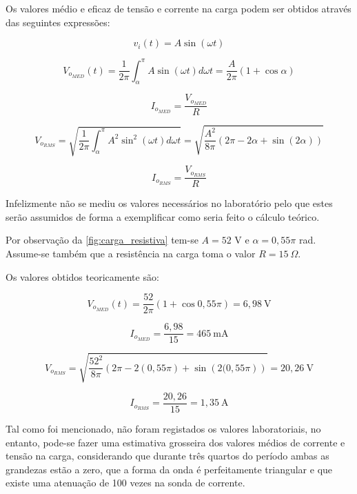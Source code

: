 \documentclass[a4paper,11pt]{article}
\numberwithin{equation}{section}
\begin{document}
Os valores médio e eficaz de tensão e corrente na carga podem ser obtidos através das seguintes expressões:


\begin{equation}
v_i(t)=A \sin(\omega t)
\end{equation}

\begin{equation}
V_{o_{MED}} (t) = \frac{1}{2\pi} \int_{\alpha}^{\pi} A \sin(\omega t) d \omega t = \frac{A}{2\pi} (1+ \cos\alpha)
\end{equation}

\begin{equation}
I_{o_{MED}}= \frac{V_{o_{MED}}}{R}
\end{equation}

\begin{equation}
V_{o_{RMS}} = \sqrt{ \frac{1}{2\pi} \int_{\alpha}^{\pi} A^2 \sin^2 (\omega t) d\omega t} = \sqrt{ \frac{A^2}{8 \pi} (2\pi - 2\alpha + \sin(2\alpha))}
\end{equation}

\begin{equation}
I_{o_{RMS}}= \frac{V_{o_{RMS}}}{R}
\end{equation}



Infelizmente não se mediu os valores necessários no laboratório pelo que estes serão assumidos de forma a exemplificar como seria feito o cálculo teórico.

Por observação da \autoref{fig:carga_resistiva} tem-se $A=52$ V e $\alpha=0,55\pi$ rad. Assume-se também que a resistência na carga toma o valor $R=15~\Omega$.

Os valores obtidos teoricamente são:

\[V_{o_{MED}} (t) = \frac{52}{2\pi} \left(1+ \cos0,55\pi \right) = 6,98~\text{V}\]

\[I_{o_{MED}}= \frac{6,98}{15} = 465~\text{mA}\]

\[V_{o_{RMS}} = \sqrt{ \frac{52^2}{8 \pi} \left(2\pi - 2\left(0,55\pi\right) + \sin\left(2(0,55\pi\right)\right)} = 20,26~\text{V} \]

\[I_{o_{RMS}}= \frac{20,26}{15} = 1,35~\text{A}\]

Tal como foi mencionado, não foram registados os valores laboratoriais, no entanto, pode-se fazer uma estimativa grosseira dos valores médios de corrente e tensão na carga, considerando que durante três quartos do período ambas as grandezas estão a zero, que a forma da onda é perfeitamente triangular e que existe uma atenuação de 100 vezes na sonda de corrente.
\end{document}
